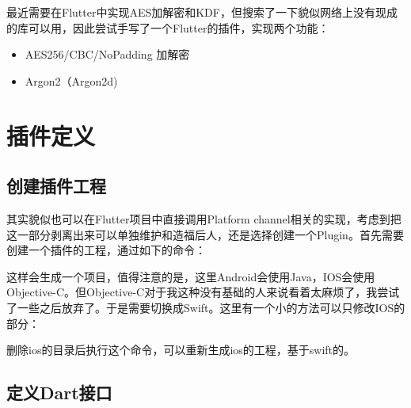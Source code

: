 \documentclass[12pt]{article}
\begin{document}
\makeblogtitle

最近需要在Flutter中实现AES加解密和KDF，但搜索了一下貌似网络上没有现成的库可以用，因此尝试手写了一个Flutter的插件，实现两个功能：

\begin{itemize}
\tightlist
\item
  AES256/CBC/NoPadding 加解密
\item
  Argon2（Argon2d)
\end{itemize}

\section{插件定义}\label{ux63d2ux4ef6ux5b9aux4e49}

\subsection{创建插件工程}\label{ux521bux5efaux63d2ux4ef6ux5de5ux7a0b}

其实貌似也可以在Flutter项目中直接调用Platform channel相关的实现，考虑到把这一部分剥离出来可以单独维护和造福后人，还是选择创建一个Plugin。首先需要创建一个插件的工程，通过如下的命令：

\begin{Shaded}
\begin{Highlighting}[]
\OperatorTok{=}
\end{Highlighting}
\end{Shaded}

这样会生成一个项目，值得注意的是，这里Android会使用Java，IOS会使用Objective-C。但Objective-C对于我这种没有基础的人来说看着太麻烦了，我尝试了一些之后放弃了。于是需要切换成Swift。这里有一个小的方法可以只修改IOS的部分：

\begin{Shaded}
\begin{Highlighting}[]
 
\end{Highlighting}
\end{Shaded}

删除ios的目录后执行这个命令，可以重新生成ios的工程，基于swift的。

\subsection{定义Dart接口}\label{ux5b9aux4e49dartux63a5ux53e3}
\end{document}
